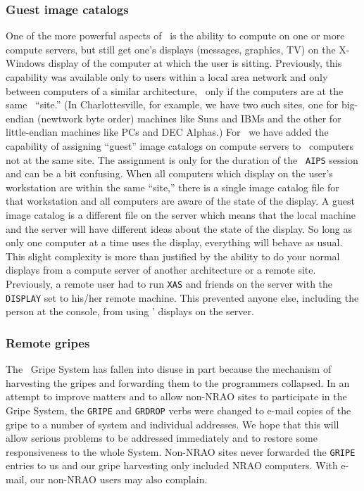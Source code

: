 \subsubsection{Guest image catalogs}

One of the more powerful aspects of \AIPS\ is the ability to compute
on one or more compute servers, but still get one's displays
(messages, graphics, TV) on the X-Windows display of the computer at
which the user is sitting.  Previously, this capability was available
only to users within a local area network and only between computers
of a similar architecture, \ie\ only if the computers are at the same
\AIPS\ ``site.''  (In Charlottesville, for example, we have two such
sites, one for big-endian (newtwork byte order) machines like Suns and
IBMs and the other for little-endian machines like PCs and DEC
Alphas.)  For \RELEASENAME\  we have added the capability of assigning
``guest'' image catalogs on compute servers to \AIPS\ computers not at
the same site.  The assignment is only for the duration of the {\tt
AIPS} session and can be a bit confusing.  When all computers which
display on the user's workstation are within the same ``site,'' there
is a single image catalog file for that workstation and all computers
are aware of the state of the display.  A guest image catalog is a
different file on the server which means that the local machine and
the server will have different ideas about the state of the display.
So long as only one computer at a time uses the display, everything
will behave as usual. This slight complexity is more than justified by
the ability to do your normal displays from a compute server of
another architecture or a remote site.  Previously, a remote user had
to run {\tt XAS} and friends on the server with the {\tt DISPLAY} set
to his/her remote machine.  This prevented anyone else, including the
person at the console, from using \AIPS' displays on the server.

\subsubsection{Remote gripes}

The \AIPS\ Gripe System has fallen into disuse in part because the
mechanism of harvesting the gripes and forwarding them to the
programmers collapsed.  In an attempt to improve matters and to allow
non-NRAO sites to participate in the Gripe System, the {\tt GRIPE} and
{\tt GRDROP} verbs were changed to e-mail copies of the gripe to a
number of system and individual addresses.  We hope that this will
allow serious problems to be addressed immediately and to restore some
responsiveness to the whole System.  Non-NRAO sites never forwarded
the {\tt GRIPE} entries to us and our gripe harvesting only included
NRAO computers.  With e-mail, our non-NRAO users may also complain.

